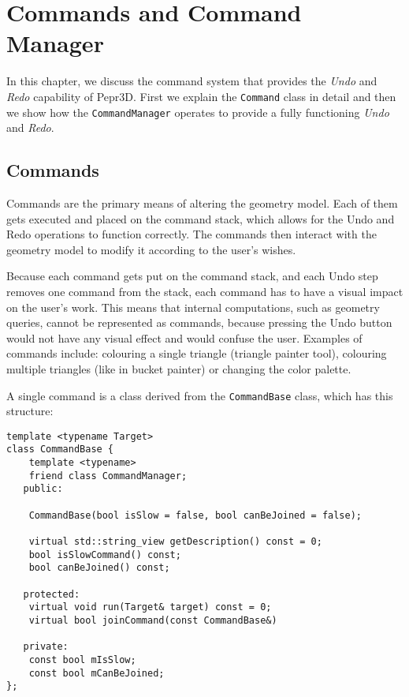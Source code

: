 \chapter{Commands and Command Manager}

In this chapter, we discuss the command system that provides the \textit{Undo} and \textit{Redo} capability of Pepr3D. First we explain the \texttt{Command} class in detail and then we show how the \texttt{CommandManager} operates to provide a fully functioning \textit{Undo} and \textit{Redo}.

\section{Commands}

Commands are the primary means of altering the geometry model. Each of them gets executed and placed on the command stack, which allows for the Undo and Redo operations to function correctly. The commands then interact with the geometry model to modify it according to the user's wishes.

Because each command gets put on the command stack, and each Undo step removes one command from the stack, each command has to have a visual impact on the user's work. This means that internal computations, such as geometry queries, cannot be represented as commands, because pressing the Undo button would not have any visual effect and would confuse the user. Examples of commands include: colouring a single triangle (triangle painter tool), colouring multiple triangles (like in bucket painter) or changing the color palette.

A single command is a class derived from the \texttt{CommandBase} class, which has this structure:

\begin{lstlisting}
template <typename Target>
class CommandBase {
    template <typename>
    friend class CommandManager;
   public:

    CommandBase(bool isSlow = false, bool canBeJoined = false);

    virtual std::string_view getDescription() const = 0;
    bool isSlowCommand() const;
    bool canBeJoined() const;

   protected:
    virtual void run(Target& target) const = 0;
    virtual bool joinCommand(const CommandBase&)

   private:
    const bool mIsSlow;
    const bool mCanBeJoined;
};
\end{lstlisting}

